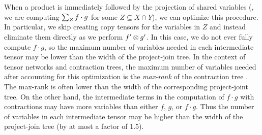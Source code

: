 When a product is immediately followed by the projection of shared variables (\ie, we are computing $\sum_Z f \cdot g$ for some $Z \subseteq X \cap Y$), we can optimize this procedure.
In particular, we skip creating copy tensors for the variables in $Z$ and instead eliminate them directly as we perform $f' \otimes g'$.
In this case, we do not ever fully compute $f \cdot g$, so the maximum number of variables needed in each intermediate tensor may be lower than the width of the project-join tree.
In the context of tensor networks and contraction trees, the maximum number of variables needed after accounting for this optimization is the \emph{max-rank} of the contraction tree \cite{KCMR18,DDV19}.
The max-rank is often lower than the width of the corresponding project-joint tree.
On the other hand, the intermediate terms in the computation of $f \cdot g$ with contractions may have more variables than either $f$, $g$, or $f \cdot g$.
Thus the number of variables in each intermediate tensor may be higher than the width of the project-join tree (by at most a factor of 1.5).
